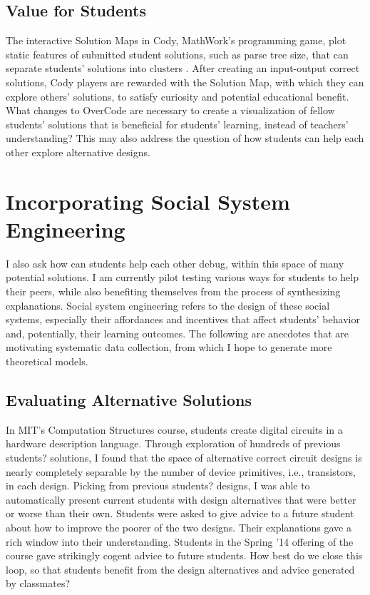 \documentclass{sigchi}
\begin{document}
\subsection{Value for Students}
The interactive Solution Maps in Cody, MathWork's programming game, plot static features of submitted student solutions, such as parse tree size, that can separate students' solutions into clusters \cite{ICERGlassman}. After creating an input-output correct solutions, Cody players are rewarded with the Solution Map, with which they can explore others' solutions, to satisfy curiosity and potential educational benefit. What changes to OverCode are necessary to create a visualization of fellow students' solutions that is beneficial for students' learning, instead of teachers' understanding? This may also address the question of how students can help each other explore alternative designs.

\section{Incorporating Social System Engineering}
I also ask how can students help each other debug, within this space of many potential solutions. I am currently pilot testing various ways for students to help their peers, while also benefiting themselves from the process of synthesizing explanations. Social system engineering refers to the design of these social systems, especially their affordances and incentives that affect students' behavior and, potentially, their learning outcomes. The following are anecdotes that are motivating systematic data collection, from which I hope to generate more theoretical models.

\subsection{Evaluating Alternative Solutions} In MIT's Computation Structures course, students create digital circuits in a hardware description language. Through exploration of hundreds of previous students? solutions, I found that the space of alternative correct circuit designs is nearly completely separable by the number of device primitives, i.e., transistors, in each design. Picking from previous students? designs, I was able to automatically present current students with design alternatives that were better or worse than their own. Students were asked to give advice to a future student about how to improve the poorer of the two designs. Their explanations gave a rich window into their understanding. Students in the Spring '14 offering of the course gave strikingly cogent advice to future students. How best do we close this loop, so that students benefit from the design alternatives and advice generated by classmates? 
\end{document}
